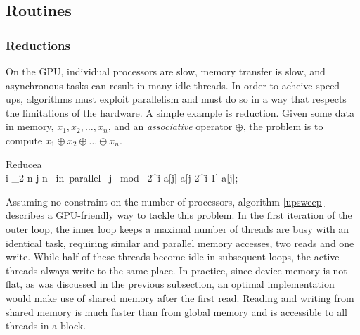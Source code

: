 \subsection{Routines}
\label{sec:routines}
\subsubsection{Reductions}
\label{subsec:reduce}
On the GPU, individual processors are slow, memory transfer is slow, and asynchronous tasks can result in many idle threads. In order to acheive speed-ups, algorithms must exploit parallelism and must do so in a way that respects the limitations of the hardware. A simple example is reduction. Given some data in memory, $x_1, x_2, \ldots, x_n$, and an \textit{associative} operator $\oplus$, the problem is to compute $x_1 \oplus x_2 \oplus \ldots \oplus x_n$. 

\begin{pseudocode}[ruled]{Reduce}{a}
\label{upsweep}
\\
\FOR i  \TO \log_2 n \DO \BEGIN
  \FOR j  \TO n \mbox{ in parallel }\DO \BEGIN
    \IF j \mbox{ mod } 2^i \DO \BEGIN
    a[j] \GETS a[j-2^{i-1}] \oplus a[j];\\
    \END \END \END
{}
\end{pseudocode}

Assuming no constraint on the number of processors, algorithm \ref{upsweep} describes a GPU-friendly way to tackle this problem. In the first iteration of the outer loop, the inner loop keeps a maximal number of threads are busy with an identical task, requiring similar and parallel memory accesses, two reads and one write. While half of these threads become idle in subsequent loops, the active threads always write to the same place. In practice, since device memory is not flat, as was discussed in the previous subsection, an optimal implementation would make use of shared memory after the first read. Reading and writing from shared memory is much faster than from global memory and is accessible to all threads in a block.



